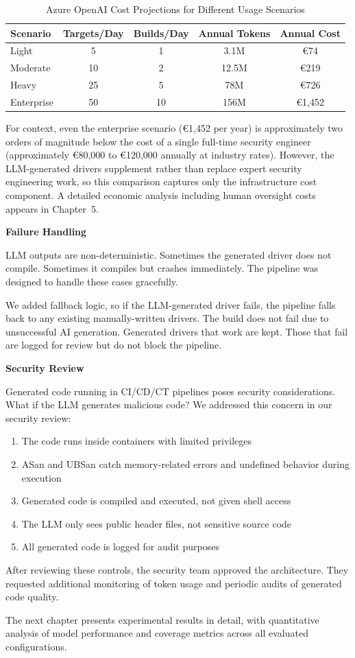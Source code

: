 \begin{table}[htbp]
\centering
\caption{Azure OpenAI Cost Projections for Different Usage Scenarios}
\label{tab:cost_scenarios_impl}
\small
\begin{tabular}{lcccc}
\toprule
Scenario & Targets/Day & Builds/Day & Annual Tokens & Annual Cost \\
\midrule
Light & 5 & 1 & 3.1M & \euro{}74 \\
Moderate & 10 & 2 & 12.5M & \euro{}219 \\
Heavy & 25 & 5 & 78M & \euro{}726 \\
Enterprise & 50 & 10 & 156M & \euro{}1,452 \\
\bottomrule
\end{tabular}
\end{table}

For context, even the enterprise scenario (\euro{}1,452 per year) is approximately two orders of magnitude below the cost of a single full-time security engineer (approximately \euro{}80,000 to \euro{}120,000 annually at industry rates). However, the LLM-generated drivers supplement rather than replace expert security engineering work, so this comparison captures only the infrastructure cost component. A detailed economic analysis including human oversight costs appears in Chapter~5.

\textbf{Failure Handling}

LLM outputs are non-deterministic. Sometimes the generated driver does not compile. Sometimes it compiles but crashes immediately. The pipeline was designed to handle these cases gracefully.

We added fallback logic, so if the LLM-generated driver fails, the pipeline falls back to any existing manually-written drivers. The build does not fail due to unsuccessful AI generation. Generated drivers that work are kept. Those that fail are logged for review but do not block the pipeline.

\textbf{Security Review}

Generated code running in CI/CD/CT pipelines poses security considerations. What if the LLM generates malicious code? We addressed this concern in our security review:

\begin{enumerate}
    \item The code runs inside containers with limited privileges
    \item ASan and UBSan catch memory-related errors and undefined behavior during execution
    \item Generated code is compiled and executed, not given shell access
    \item The LLM only sees public header files, not sensitive source code
    \item All generated code is logged for audit purposes
\end{enumerate}

After reviewing these controls, the security team approved the architecture. They requested additional monitoring of token usage and periodic audits of generated code quality.

The next chapter presents experimental results in detail, with quantitative analysis of model performance and coverage metrics across all evaluated configurations.